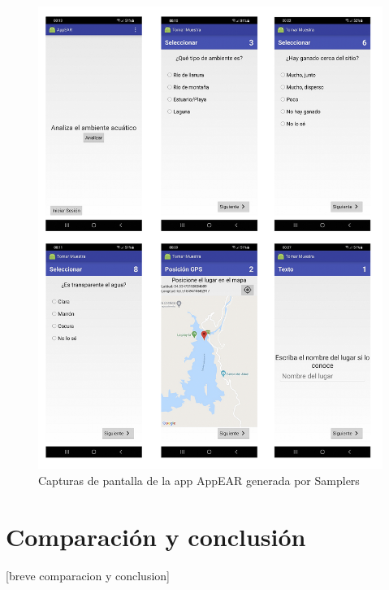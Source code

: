 \begin{figure}[H]
  \centering
   \includegraphics[scale=0.5]{06-caso_de_uso/capturas_appear_samplers.png} 
    \caption{Capturas de pantalla de la app AppEAR generada por Samplers}
\end{figure}

\section{Comparación y conclusión}
[breve comparacion y conclusion]
